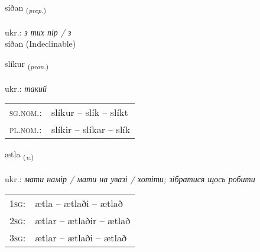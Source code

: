 \documentclass[frontgrid, backgrid]{flacards}\usepackage[]{graphicx}\usepackage[]{xcolor}
\begin{document}
{síðan \small{\textsubscript{(\textit{prep.})}} \\[1ex]
\textphonetic{[siːðan]} \\
ukr.: \emph{з тих пір / з} \\  [2ex]
síðan (Indeclinable)}

\renewcommand{\flhead}{\vskip5pt \fboxsep=0pt {\small\bfseries\footnotesize Fornafn | займенник}}
\renewcommand{\fcfoot}{\vskip5pt \fboxsep=0pt \hspace{2pt}{\small\bfseries\footnotesize 1K}}

\renewcommand{\blhead}{\vskip5pt {\small\bfseries\footnotesize Fornafn | займенник }}
\renewcommand{\bcfoot}{\vskip5pt \hspace{2pt}{\small\bfseries\footnotesize 1K}}


{slíkur \small{\textsubscript{(\textit{pron.})}} \\[1ex] %
\textphonetic{[stliːkʏr]} \\
ukr.: \emph{такий} \\  [2ex]
\renewcommand*{\arraystretch}{0.8}
\begin{tabular}{ll}
\textsc{sg.nom.}: & slíkur  --  slík -- slíkt \\ 
\textsc{pl.nom.}: & slíkir -- slíkar -- slík
\end{tabular}
}

\renewcommand{\flhead}{\vskip5pt \fboxsep=0pt {\small\bfseries\footnotesize Sagnorð | дієслово}}
\renewcommand{\fcfoot}{\vskip5pt \fboxsep=0pt \hspace{2pt}{\small\bfseries\footnotesize 1K}}

\renewcommand{\blhead}{\vskip5pt {\small\bfseries\footnotesize Sagnorð | дієслово }}
\renewcommand{\bcfoot}{\vskip5pt \hspace{2pt}{\small\bfseries\footnotesize 1K}}


{ætla \small{\textsubscript{(\textit{v.})}} \\[1ex] %
\textphonetic{[aihtla]} \\
ukr.: \emph{мати намір / мати на увазі / хотіти; зібратися щось робити} \\  [2ex]
\renewcommand*{\arraystretch}{0.8}
\begin{tabular}{p{1cm}l}
\textsc{1sg}: & ætla -- ætlaði -- ætlað \\ 
\textsc{2sg}: & ætlar -- ætlaðir -- ætlað \\ 
\textsc{3sg}: & ætlar -- ætlaði -- ætlað \\ 
\end{tabular}
}
\end{document}
